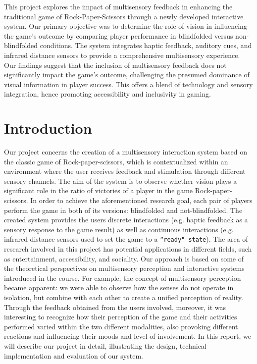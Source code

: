 \documentclass[11pt,a4paper]{report}
\begin{document}
This project explores the impact of multisensory feedback in enhancing the traditional game of Rock-Paper-Scissors through a newly developed interactive system. Our primary objective was to determine the role of vision in influencing the game's outcome by comparing player performance in blindfolded versus non-blindfolded conditions. The system integrates haptic feedback, auditory cues, and infrared distance sensors to provide a comprehensive multisensory experience.
Our findings suggest that the inclusion of multisensory feedback does not significantly impact the game's outcome, challenging the presumed dominance of visual information in player success. This offers a blend of technology and sensory integration, hence promoting accessibility and inclusivity in gaming.

\section*{Introduction}
Our project concerns the creation of a multisensory interaction system based on the classic game of Rock-paper-scissors, which is contextualized within an environment where the user receives feedback and stimulation through different sensory channels. The aim of the system is to observe whether vision plays a significant role in the ratio of victories of a player in the game Rock-paper-scissors. In order to achieve the aforementioned research goal, each pair of players perform the game in both of its versions: blindfolded and not-blindfolded. 
The created system provides the users discrete interactions (e.g. haptic feedback as a sensory response to the game result) as well as continuous interactions (e.g. infrared distance sensors used to set the game to a \texttt{“ready" state}).
The area of research involved in this project has potential applications in different fields, such as entertainment, accessibility, and sociality.
Our approach is based on some of the theoretical perspectives on multisensory perception and interactive systems introduced in the course.
For example, the concept of multisensory perception became apparent: we were able to observe how the senses do not operate in isolation, but combine with each other to create a unified perception of reality.
Through the feedback obtained from the users involved, moreover, it was interesting to recognize how their perception of the game and their activities performed varied within the two different modalities, also provoking different reactions and influencing their moods and level of involvement.
In this report, we will describe our project in detail, illustrating the design, technical implementation and evaluation of our system.
\end{document}
